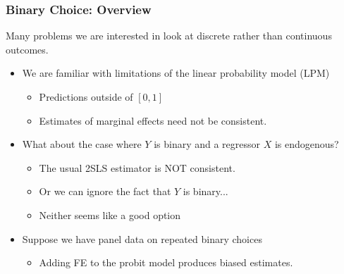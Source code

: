 \documentclass[aspectratio=169]{beamer}
\begin{document}
\begin{frame}
\frametitle{Binary Choice: Overview}
Many problems we are interested in look at discrete rather than continuous outcomes.
\begin{itemize}
\item We are familiar with limitations of the linear probability model (LPM)
\begin{itemize}
\item Predictions outside of $[0,1]$
\item Estimates of marginal effects need not be consistent.
\end{itemize}
\item What about the case where $Y$ is binary and a regressor $X$ is endogenous?
\begin{itemize}
\item The usual 2SLS estimator is \alert{NOT consistent}.
\item Or we can ignore the fact that $Y$ is binary...
\item Neither seems like a good option
\end{itemize}
\item Suppose we have panel data on repeated binary choices
\begin{itemize}
\item Adding FE to the probit model produces biased estimates.
\end{itemize}
\end{itemize}
\end{frame}
\end{document}
